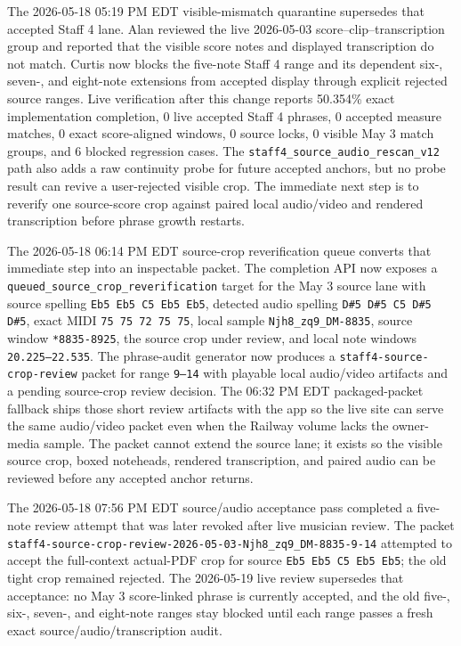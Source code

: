 \documentclass[12pt,letterpaper]{article}
\begin{document}
The 2026-05-18 05:19 PM EDT visible-mismatch quarantine supersedes that accepted Staff 4 lane. Alan reviewed the live 2026-05-03 score--clip--transcription group and reported that the visible score notes and displayed transcription do not match. Curtis now blocks the five-note Staff 4 range and its dependent six-, seven-, and eight-note extensions from accepted display through explicit rejected source ranges. Live verification after this change reports 50.354\% exact implementation completion, 0 live accepted Staff 4 phrases, 0 accepted measure matches, 0 exact score-aligned windows, 0 source locks, 0 visible May 3 match groups, and 6 blocked regression cases. The \texttt{staff4\_source\_audio\_rescan\_v12} path also adds a raw continuity probe for future accepted anchors, but no probe result can revive a user-rejected visible crop. The immediate next step is to reverify one source-score crop against paired local audio/video and rendered transcription before phrase growth restarts.

The 2026-05-18 06:14 PM EDT source-crop reverification queue converts that immediate step into an inspectable packet. The completion API now exposes a \texttt{queued\_source\_crop\_reverification} target for the May 3 source lane with source spelling \texttt{Eb5 Eb5 C5 Eb5 Eb5}, detected audio spelling \texttt{D\#5 D\#5 C5 D\#5 D\#5}, exact MIDI \texttt{75 75 72 75 75}, local sample \texttt{Njh8\_zq9\_DM-8835}, source window \texttt{*8835-8925}, the source crop under review, and local note windows \texttt{20.225--22.535}. The phrase-audit generator now produces a \texttt{staff4-source-crop-review} packet for range \texttt{9--14} with playable local audio/video artifacts and a pending source-crop review decision. The 06:32 PM EDT packaged-packet fallback ships those short review artifacts with the app so the live site can serve the same audio/video packet even when the Railway volume lacks the owner-media sample. The packet cannot extend the source lane; it exists so the visible source crop, boxed noteheads, rendered transcription, and paired audio can be reviewed before any accepted anchor returns.

The 2026-05-18 07:56 PM EDT source/audio acceptance pass completed a five-note review attempt that was later revoked after live musician review. The packet \texttt{staff4-source-crop-review-2026-05-03-Njh8\_zq9\_DM-8835-9-14} attempted to accept the full-context actual-PDF crop for source \texttt{Eb5 Eb5 C5 Eb5 Eb5}; the old tight crop remained rejected. The 2026-05-19 live review supersedes that acceptance: no May 3 score-linked phrase is currently accepted, and the old five-, six-, seven-, and eight-note ranges stay blocked until each range passes a fresh exact source/audio/transcription audit.
\end{document}
